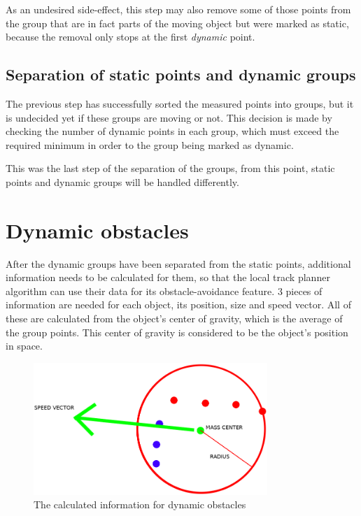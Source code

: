 As an undesired side-effect, this step may also remove some of those points from the group that are in fact parts of the moving object but were marked as static, because the removal only stops at the first \textit{dynamic} point.

\subsection{Separation of static points and dynamic groups}

The previous step has successfully sorted the measured points into groups, but it is undecided yet if these groups are moving or not. This decision is made by checking the number of dynamic points in each group, which must exceed the required minimum in order to the group being marked as dynamic.

This was the last step of the separation of the groups, from this point, static points and dynamic groups will be handled differently.

\section{Dynamic obstacles}
After the dynamic groups have been separated from the static points, additional information needs to be calculated for them, so that the local track planner algorithm can use their data for its obstacle-avoidance feature. 3 pieces of information are needed for each object, its position, size and speed vector. All of these are calculated from the object's center of gravity, which is the average of the group points. This center of gravity is considered to be the object's position in space.

\begin{figure}[!ht]
    \centering
    \includegraphics[height=50mm]{figures/raw/dynamic_information.png}
    \caption{The calculated information for dynamic obstacles}
    \label{dynamic_information}
\end{figure}

